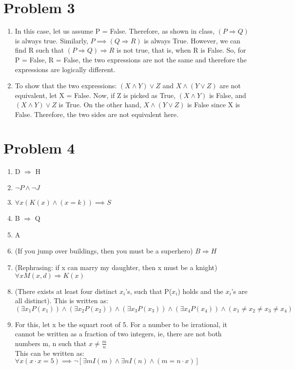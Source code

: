 \documentclass[english]{article}
\begin{document}
\section*{Problem 3}
\begin{enumerate} [label=\alph*]
	\item In this case, let us assume P = False. Therefore, as shown in class, $ (P \Rightarrow Q ) $ is always true. Similarly, $P \implies ( Q \Rightarrow R )$ is always True. However, we can find R such that $ (P \Rightarrow Q) \Rightarrow R  $ is not true, that is, when R is False. So, for P = False, R = False, the two expressions are not the same and therefore the expressions are logically different. 
	\item To show that the two expressions: $ (X \land Y) \lor Z $ and $ X \land (Y \lor Z)$ are not equivalent, let X = False. Now, if Z is picked as True, $ (X \land Y) $ is False, and $ (X \land Y) \lor Z $ is True. On the other hand, $ X \land (Y \lor Z)$ is False since X is False. Therefore, the two sides are not equivalent here. 
\end{enumerate}
\section*{Problem 4}
\begin{enumerate} [label=\alph*]
	\item D $\Rightarrow$ H
	\item $\lnot P \land \lnot J$
	\item  $\forall x (K(x) \land (x = k) ) \implies S $%
	\item B $\Rightarrow$ Q
	\item A
	\item (If you jump over buildings, then you must be a superhero) $ B \Rightarrow H$
	\item (Rephrasing: if x can marry my daughter, then x must be a knight) $ \forall x M(x,d) \Rightarrow K(x)$
	\item (There exists at least four distinct $x_i$'s, such that P($x_i$) holds and the $x_i$'s are all distinct). This is written as: $(\exists x_1 P(x_1)) \land (\exists x_2 P(x_2)) \land (\exists x_3 P(x_3)) \land (\exists x_4 P(x_4)) \land (x_1 \neq x_2 \neq x_3 \neq x_4) $
	\item For this, let x be the squart root of 5. For a number to be irrational, it cannot be written as a fraction of two integers, ie, there are not both numbers m, n such that $ x \neq \frac{m}{n} $ \\ This can be written as: $\forall x (x \cdot x = 5) \implies \lnot [\exists m I(m) \land  \exists n I(n) \land (m = n \cdot x)] $

\end{enumerate}
\end{document}
